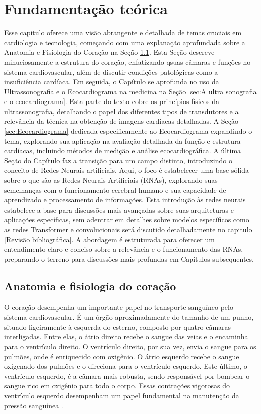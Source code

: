 \chapter{Fundamentação teórica}
\label{Fundamentação teórica}

Esse capitulo oferece uma visão abrangente e detalhada de temas cruciais em cardiologia e tecnologia, começando com uma explanação aprofundada sobre a Anatomia e Fisiologia do Coração na Seção \ref{sec:Anatomia e fisiologia da coração}. Esta Seção descreve minuciosamente a estrutura do coração, enfatizando qsuas câmaras e funções no sistema cardiovascular, além de discutir condições patológicas como a insuficiência cardíaca.  Em seguida, o Capítulo se aprofunda no uso da Ultrassonografia e o Ecocardiograma na medicina na Seção \ref{sec:A ultra sonografia e o ecocardiograma}. Esta parte do texto cobre os princípios físicos da ultrassonografia, detalhando o papel dos diferentes tipos de transdutores e a relevância da técnica na obtenção de imagens cardíacas detalhadas. A Seção \ref{sec:Ecocardiograma} dedicada especificamente ao Ecocardiograma expandindo o tema, explorando sua aplicação na avaliação detalhada da função e estrutura cardíacas, incluindo métodos de medição e análise ecocardiográfica. A última Seção do Capítulo faz a transição para um campo distinto, introduzindo o conceito de Redes Neurais artificiais. Aqui, o foco é estabelecer uma base sólida sobre o que são as Redes Neurais Artificiais (RNAs), explorando suas semelhanças com o funcionamento cerebral humano e sua capacidade de aprendizado e processamento de informações. Esta introdução às redes neurais estabelece a base para discussões mais avançadas sobre suas arquiteturas e aplicações específicas, sem adentrar em detalhes sobre modelos específicos como as redes Transformer e convolucionais será discutido detalhadamente no capitulo \ref{Revisão bibliográfica}. A abordagem é  estruturada para oferecer um entendimento claro e conciso sobre a relevância e o funcionamento das RNAs, preparando o terreno para discussões mais profundas em Capítulos subsequentes.

\section{Anatomia e fisiologia do coração}
\label{sec:Anatomia e fisiologia da coração}

O coração desempenha um importante papel no transporte sanguíneo pelo sistema cardiovascular. É um órgão aproximadamente do tamanho de um punho, situado ligeiramente à esquerda do esterno, composto por quatro câmaras interligadas. Entre elas, o átrio direito recebe o sangue das veias e o encaminha para o ventrículo direito. O ventrículo direito, por sua vez, envia o sangue para os pulmões, onde é enriquecido com oxigênio. O átrio esquerdo recebe o sangue oxigenado dos pulmões e o direciona para o ventrículo esquerdo. Este último, o ventrículo esquerdo, é a câmara mais robusta, sendo responsável por bombear o sangue rico em oxigênio para todo o corpo. Essas contrações vigorosas do ventrículo esquerdo desempenham um papel fundamental na manutenção da pressão sanguínea \cite{Tortora2023-wk}.

